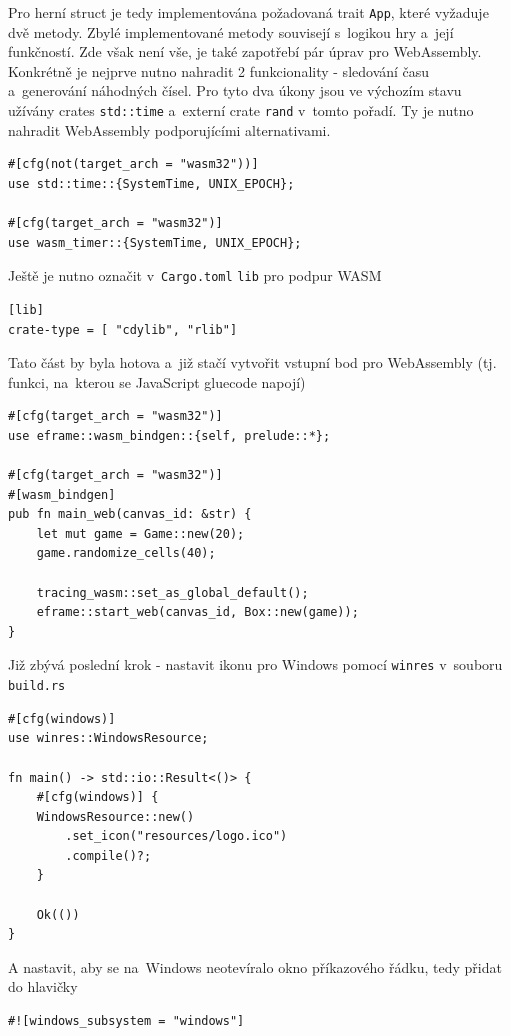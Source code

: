 \documentclass[a4paper, 12pt, twoside]{article} %
\newcommand{\rust}[1]{\texttt{#1}}
\begin{document}
		Pro herní struct je tedy implementována požadovaná trait \rust{App}, které vyžaduje dvě metody. Zbylé implementované metody souvisejí s~logikou hry a~její funkčností. Zde však není vše, je také zapotřebí pár úprav pro WebAssembly. Konkrétně je nejprve nutno nahradit 2 funkcionality - sledování času a~generování náhodných čísel. Pro tyto dva úkony jsou ve výchozím stavu užívány crates \rust{std::time} a~externí crate \rust{rand} v~tomto pořadí. Ty je nutno nahradit WebAssembly podporujícími alternativami.
		\begin{verbatim}
#[cfg(not(target_arch = "wasm32"))]
use std::time::{SystemTime, UNIX_EPOCH};

#[cfg(target_arch = "wasm32")]
use wasm_timer::{SystemTime, UNIX_EPOCH};
		\end{verbatim}
		
		Ještě je nutno označit v~\texttt{Cargo.toml} \texttt{lib} pro podpur WASM
		\begin{verbatim}
[lib]
crate-type = [ "cdylib", "rlib"]
		\end{verbatim}
		
		Tato část by byla hotova a~již stačí vytvořit vstupní bod pro WebAssembly (tj. funkci, na~kterou se JavaScript gluecode napojí)
		\begin{verbatim}
#[cfg(target_arch = "wasm32")]
use eframe::wasm_bindgen::{self, prelude::*};

#[cfg(target_arch = "wasm32")]
#[wasm_bindgen]
pub fn main_web(canvas_id: &str) {
	let mut game = Game::new(20);
	game.randomize_cells(40);

	tracing_wasm::set_as_global_default();
	eframe::start_web(canvas_id, Box::new(game));
}
		\end{verbatim}
		
		Již zbývá poslední krok - nastavit ikonu pro Windows pomocí \rust{winres} v~souboru \texttt{build.rs}
		\begin{verbatim}
#[cfg(windows)]
use winres::WindowsResource;

fn main() -> std::io::Result<()> {
	#[cfg(windows)] {
	WindowsResource::new()
		.set_icon("resources/logo.ico")
		.compile()?;
	}

	Ok(())
}
		\end{verbatim}
		
		A nastavit, aby se na~Windows neotevíralo okno příkazového řádku, tedy přidat do hlavičky 
		\begin{verbatim}
#![windows_subsystem = "windows"]
		\end{verbatim}
\end{document}
